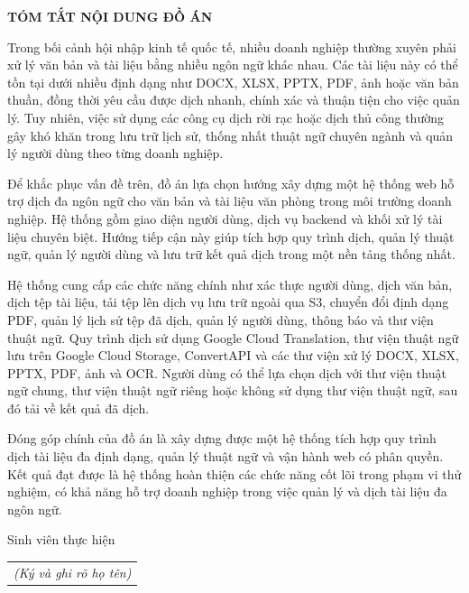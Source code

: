 \documentclass[../DoAn.tex]{subfiles}
\begin{document}
\begin{center}
    \Large{\textbf{TÓM TẮT NỘI DUNG ĐỒ ÁN}}\\
\end{center}
\vspace{1cm}
\indent Trong bối cảnh hội nhập kinh tế quốc tế, nhiều doanh nghiệp thường xuyên phải xử lý văn bản và tài liệu bằng nhiều ngôn ngữ khác nhau. Các tài liệu này có thể tồn tại dưới nhiều định dạng như DOCX, XLSX, PPTX, PDF, ảnh hoặc văn bản thuần, đồng thời yêu cầu được dịch nhanh, chính xác và thuận tiện cho việc quản lý. Tuy nhiên, việc sử dụng các công cụ dịch rời rạc hoặc dịch thủ công thường gây khó khăn trong lưu trữ lịch sử, thống nhất thuật ngữ chuyên ngành và quản lý người dùng theo từng doanh nghiệp.

Để khắc phục vấn đề trên, đồ án lựa chọn hướng xây dựng một hệ thống web hỗ trợ dịch đa ngôn ngữ cho văn bản và tài liệu văn phòng trong môi trường doanh nghiệp. Hệ thống gồm giao diện người dùng, dịch vụ backend và khối xử lý tài liệu chuyên biệt. Hướng tiếp cận này giúp tích hợp quy trình dịch, quản lý thuật ngữ, quản lý người dùng và lưu trữ kết quả dịch trong một nền tảng thống nhất.

Hệ thống cung cấp các chức năng chính như xác thực người dùng, dịch văn bản, dịch tệp tài liệu, tải tệp lên dịch vụ lưu trữ ngoài qua S3, chuyển đổi định dạng PDF, quản lý lịch sử tệp đã dịch, quản lý người dùng, thông báo và thư viện thuật ngữ. Quy trình dịch sử dụng Google Cloud Translation, thư viện thuật ngữ lưu trên Google Cloud Storage, ConvertAPI và các thư viện xử lý DOCX, XLSX, PPTX, PDF, ảnh và OCR. Người dùng có thể lựa chọn dịch với thư viện thuật ngữ chung, thư viện thuật ngữ riêng hoặc không sử dụng thư viện thuật ngữ, sau đó tải về kết quả đã dịch.

 Đóng góp chính của đồ án là xây dựng được một hệ thống tích hợp quy trình dịch tài liệu đa định dạng, quản lý thuật ngữ và vận hành web có phân quyền. Kết quả đạt được là hệ thống hoàn thiện các chức năng cốt lõi trong phạm vi thử nghiệm, có khả năng hỗ trợ doanh nghiệp trong việc quản lý và dịch tài liệu đa ngôn ngữ.
\begin{flushright}
Sinh viên thực hiện\\
\begin{tabular}{@{}c@{}}
\textit{(Ký và ghi rõ họ tên)}
\end{tabular}
\end{flushright}
\end{document}
